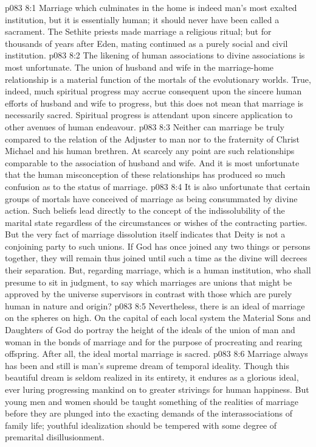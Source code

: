 \vs p083 8:1 Marriage which culminates in the home is indeed man’s most exalted institution, but it is essentially human; it should never have been called a sacrament. The Sethite priests made marriage a religious ritual; but for thousands of years after Eden, mating continued as a purely social and civil institution.
\vs p083 8:2 The likening of human associations to divine associations is most unfortunate. The union of husband and wife in the marriage\hyp{}home relationship is a material function of the mortals of the evolutionary worlds. True, indeed, much spiritual progress may accrue consequent upon the sincere human efforts of husband and wife to progress, but this does not mean that marriage is necessarily sacred. Spiritual progress is attendant upon sincere application to other avenues of human endeavour.
\vs p083 8:3 Neither can marriage be truly compared to the relation of the Adjuster to man nor to the fraternity of Christ Michael and his human brethren. At scarcely any point are such relationships comparable to the association of husband and wife. And it is most unfortunate that the human misconception of these relationships has produced so much confusion as to the status of marriage.
\vs p083 8:4 It is also unfortunate that certain groups of mortals have conceived of marriage as being consummated by divine action. Such beliefs lead directly to the concept of the indissolubility of the marital state regardless of the circumstances or wishes of the contracting parties. But the very fact of marriage dissolution itself indicates that Deity is not a conjoining party to such unions. If God has once joined any two things or persons together, they will remain thus joined until such a time as the divine will decrees their separation. But, regarding marriage, which is a human institution, who shall presume to sit in judgment, to say which marriages are unions that might be approved by the universe supervisors in contrast with those which are purely human in nature and origin?
\vs p083 8:5 Nevertheless, there is an ideal of marriage on the spheres on high. On the capital of each local system the Material Sons and Daughters of God do portray the height of the ideals of the union of man and woman in the bonds of marriage and for the purpose of procreating and rearing offspring. After all, the ideal mortal marriage is  sacred.
\vs p083 8:6 \pc Marriage always has been and still is man’s supreme dream of temporal ideality. Though this beautiful dream is seldom realized in its entirety, it endures as a glorious ideal, ever luring progressing mankind on to greater strivings for human happiness. But young men and women should be taught something of the realities of marriage before they are plunged into the exacting demands of the interassociations of family life; youthful idealization should be tempered with some degree of premarital disillusionment.

